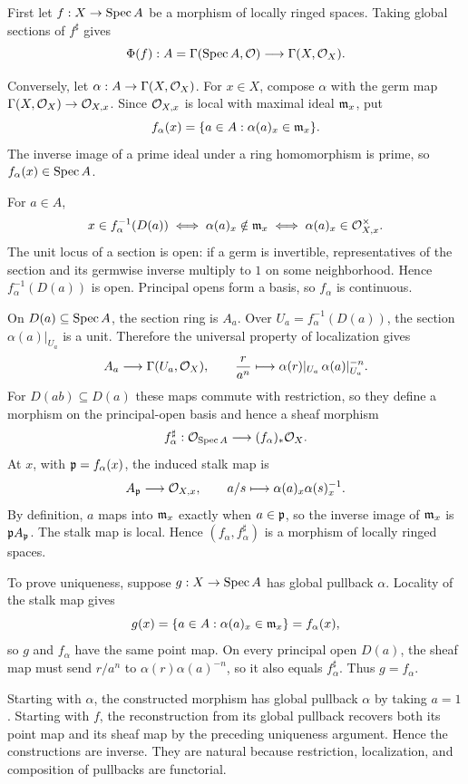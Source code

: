 \begin{solution}
First let $f:X\to\operatorname{Spec} A$ be a morphism of locally ringed spaces.  Taking global sections of
$f^\sharp$ gives
\[
\Phi(f):A=\Gamma(\operatorname{Spec} A,\mathcal O)\longrightarrow\Gamma(X,\mathcal O_X).
\]

Conversely, let $\alpha:A\to\Gamma(X,\mathcal O_X)$.  For $x\in X$, compose $\alpha$ with the germ map
$\Gamma(X,\mathcal O_X)\to\mathcal O_{X,x}$.  Since $\mathcal O_{X,x}$ is local with maximal ideal $\mathfrak m_x$, put
\[
f_\alpha(x)=\{a\in A:\alpha(a)_x\in\mathfrak m_x\}.
\]
The inverse image of a prime ideal under a ring homomorphism is prime, so $f_\alpha(x)\in\operatorname{Spec} A$.

For $a\in A$,
\[
x\in f_\alpha^{-1}(D(a))
\iff \alpha(a)_x\notin\mathfrak m_x
\iff \alpha(a)_x\in\mathcal O_{X,x}^{\times}.
\]
The unit locus of a section is open: if a germ is invertible, representatives of the section and its germwise inverse multiply to $1$ on some neighborhood.  Hence $f_\alpha^{-1}(D(a))$ is open.  Principal opens form a basis, so $f_\alpha$ is continuous.

On $D(a)\subseteq\operatorname{Spec} A$, the section ring is $A_a$.  Over $U_a=f_\alpha^{-1}(D(a))$, the section $\alpha(a)|_{U_a}$ is a unit.  Therefore the universal property of localization gives
\[
A_a\longrightarrow\Gamma(U_a,\mathcal O_X),\qquad
\frac{r}{a^n}\longmapsto
\alpha(r)|_{U_a}\,\alpha(a)|_{U_a}^{-n}.
\]
For $D(ab)\subseteq D(a)$ these maps commute with restriction, so they define a morphism on the principal-open basis and hence a sheaf morphism
\[
f_\alpha^\sharp:\mathcal O_{\operatorname{Spec} A}\longrightarrow (f_\alpha)_*\mathcal O_X.
\]
At $x$, with $\mathfrak p=f_\alpha(x)$, the induced stalk map is
\[
A_\mathfrak p\longrightarrow\mathcal O_{X,x},\qquad a/s\longmapsto\alpha(a)_x\alpha(s)_x^{-1}.
\]
By definition, $a$ maps into $\mathfrak m_x$ exactly when $a\in\mathfrak p$, so the inverse image of $\mathfrak m_x$ is $\mathfrak p A_\mathfrak p$.  The stalk map is local.  Hence $(f_\alpha,f_\alpha^\sharp)$ is a morphism of locally ringed spaces.

To prove uniqueness, suppose $g:X\to\operatorname{Spec} A$ has global pullback $\alpha$.  Locality of the stalk map gives
\[
g(x)=\{a\in A:\alpha(a)_x\in\mathfrak m_x\}=f_\alpha(x),
\]
so $g$ and $f_\alpha$ have the same point map.  On every principal open $D(a)$, the sheaf map must send $r/a^n$ to $\alpha(r)\alpha(a)^{-n}$, so it also equals $f_\alpha^\sharp$.  Thus $g=f_\alpha$.

Starting with $\alpha$, the constructed morphism has global pullback $\alpha$ by taking $a=1$.  Starting with $f$, the reconstruction from its global pullback recovers both its point map and its sheaf map by the preceding uniqueness argument.  Hence the constructions are inverse.  They are natural because restriction, localization, and composition of pullbacks are functorial.
\end{solution}

